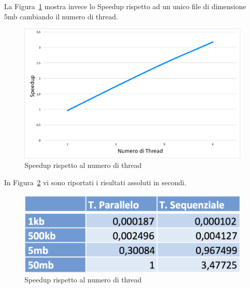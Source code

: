 \documentclass[10pt,twocolumn,letterpaper]{article}
\begin{document}
La Figura~\ref{fig:speed2} mostra invece lo Speedup rispetto ad un unico file di dimensione 5mb cambiando il numero di thread.\\
\begin{figure}
  \centering
    \includegraphics[width=\linewidth]{img/speed2.png}
  \caption{Speedup rispetto al numero di thread}
  \label{fig:speed2}
\end{figure}
In Figura~\ref{fig:ris} vi sono riportati i risultati assoluti in secondi. \\
\begin{figure}
  \centering
    \includegraphics[width=\linewidth]{img/risultati.png}
  \caption{Speedup rispetto al numero di thread}
  \label{fig:ris}
\end{figure}
\end{document}
